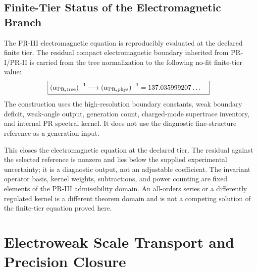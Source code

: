 \documentclass[11pt]{article}
\begin{document}
\subsection{Finite-Tier Status of the Electromagnetic Branch}
\label{subsec:priii-alpha-closure-status}

The PR-III electromagnetic equation is reproducibly evaluated at the declared finite tier.  The residual compact electromagnetic boundary inherited from PR-I/PR-II is carried from the tree normalization to the following no-fit finite-tier value:
\begin{equation}
\boxed{
\begin{split}
\left(\alpha_{\rm PR,tree}\right)^{-1}
\longrightarrow
\left(\alpha_{\rm PR,phys}\right)^{-1}
= {} &
137.035999207 \dots
\end{split}
}
\end{equation}
The construction uses the high-resolution boundary constants, weak boundary deficit, weak-angle output, generation count, charged-mode supertrace inventory, and internal PR spectral kernel.  It does not use the diagnostic fine-structure reference as a generation input.

This closes the electromagnetic equation at the declared tier.  The residual against the selected reference is nonzero and lies below the supplied experimental uncertainty; it is a diagnostic output, not an adjustable coefficient.  The invariant operator basis, kernel weights, subtractions, and power counting are fixed elements of the PR-III admissibility domain.  An all-orders series or a differently regulated kernel is a different theorem domain and is not a competing solution of the finite-tier equation proved
here.

\section{Electroweak Scale Transport and Precision Closure}
\label{sec:priii-electroweak-closure}
\end{document}
